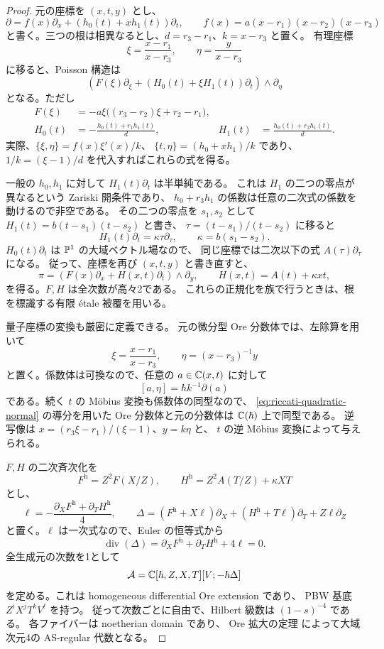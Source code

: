 \begin{proof}
元の座標を $(x,t,y)$ とし、
\[
 \partial=f(x)\partial_x+(h_0(t)+xh_1(t))\partial_t,
 \qquad f(x)=a(x-r_1)(x-r_2)(x-r_3)
\]
と書く。三つの根は相異なるとし、$d=r_3-r_1$、$k=x-r_3$ と置く。
有理座標
\[
 \xi=\frac{x-r_1}{x-r_3},\qquad \eta=\frac{y}{x-r_3}
\]
に移ると、Poisson 構造は
\[
 \left(F(\xi)\partial_\xi
     +(H_0(t)+\xi H_1(t))\partial_t\right)\wedge\partial_\eta
\]
となる。ただし
\begin{align*}
 F(\xi)&=-a\xi\bigl((r_3-r_2)\xi+r_2-r_1\bigr),\\
 H_0(t)&=-\frac{h_0(t)+r_1h_1(t)}d,
 &H_1(t)&=\frac{h_0(t)+r_3h_1(t)}d.
\end{align*}
実際、$\{\xi,\eta\}=f(x)\xi'(x)/k$、
$\{t,\eta\}=(h_0+xh_1)/k$ であり、
$1/k=(\xi-1)/d$ を代入すればこれらの式を得る。

一般の $h_0,h_1$ に対して $H_1(t)\partial_t$ は半単純である。
これは $H_1$ の二つの零点が異なるという Zariski 開条件であり、
$h_0+r_3h_1$ の係数は任意の二次式の係数を動けるので非空である。
その二つの零点を $s_1,s_2$ として
$H_1(t)=b(t-s_1)(t-s_2)$ と書き、
$\tau=(t-s_1)/(t-s_2)$ に移ると
\[
 H_1(t)\partial_t=\kappa\tau\partial_\tau,
 \qquad \kappa=b(s_1-s_2).
\]
$H_0(t)\partial_t$ は $\mathbb P^1$ の大域ベクトル場なので、
同じ座標では二次以下の式 $A(\tau)\partial_\tau$ になる。
従って、座標を再び $(x,t,y)$ と書き直すと、
\begin{equation}\label{eq:riccati-quadratic-normal}
 \pi=\left(F(x)\partial_x+H(x,t)\partial_t\right)\wedge\partial_y,
 \qquad H(x,t)=A(t)+\kappa xt,
\end{equation}
を得る。$F,H$ は全次数が高々2である。
これらの正規化を族で行うときは、根を標識する有限 \'etale 被覆を用いる。

量子座標の変換も厳密に定義できる。
元の微分型 Ore 分数体では、左除算を用いて
\[
 \xi=\frac{x-r_1}{x-r_3},\qquad
 \eta=(x-r_3)^{-1}y
\]
と置く。係数体は可換なので、任意の $a\in\mathbb C(x,t)$ に対して
\[
 [a,\eta]=\hbar k^{-1}\partial(a)
\]
である。続く $t$ の M\"obius 変換も係数体の同型なので、
\eqref{eq:riccati-quadratic-normal} の導分を用いた
Ore 分数体と元の分数体は $\mathbb C(\hbar)$ 上で同型である。
逆写像は $x=(r_3\xi-r_1)/(\xi-1)$、$y=k\eta$ と、
$t$ の逆 M\"obius 変換によって与えられる。

$F,H$ の二次斉次化を
\[
 F^{\mathrm h}=Z^2F(X/Z),\qquad
 H^{\mathrm h}=Z^2A(T/Z)+\kappa XT
\]
とし、
\[
 \ell=-\frac{\partial_XF^{\mathrm h}+\partial_TH^{\mathrm h}}4,
 \qquad
 \Delta=(F^{\mathrm h}+X\ell)\partial_X
          +(H^{\mathrm h}+T\ell)\partial_T+Z\ell\partial_Z
\]
と置く。$\ell$ は一次式なので、Euler の恒等式から
\[
 \operatorname{div}(\Delta)
  =\partial_XF^{\mathrm h}+\partial_TH^{\mathrm h}+4\ell=0.
\]
全生成元の次数を1として
\[
 \mathcal A=\mathbb C[\hbar,Z,X,T][V;-\hbar\Delta]
\]
を定める。これは homogeneous differential Ore extension であり、
PBW 基底 $Z^iX^jT^kV^\ell$ を持つ。
従って次数ごとに自由で、Hilbert 級数は $(1-s)^{-4}$ である。
各ファイバーは noetherian domain であり、
Ore 拡大の定理 \cite[定理0.2、\S1.2--1.3]{LiuWangWu}
によって大域次元4の AS-regular 代数となる。


\end{proof}
